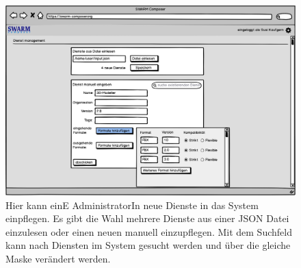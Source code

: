 \begin{figure}[h]
	\centering
	\includegraphics[width=\textwidth]{img/admin}
	\caption{
            Hier kann einE AdministratorIn neue Dienste in das System einpflegen.
            Es gibt die Wahl mehrere Dienste aus einer JSON Datei einzulesen
            oder einen neuen manuell einzupflegen. Mit dem Suchfeld kann nach Diensten
            im System gesucht werden und über die gleiche Maske verändert werden.
        }
	\label{fig:admin}
\end{figure}